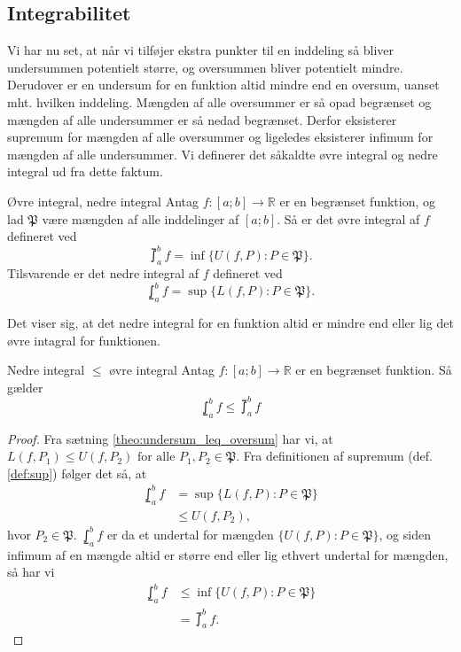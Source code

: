 \subsection{Integrabilitet}%
  \label{sub:Integrabilitet}

Vi har nu set, at når vi tilføjer ekstra punkter til en inddeling så bliver undersummen potentielt større, og oversummen bliver potentielt mindre.
Derudover er en undersum for en funktion altid mindre end en oversum, uanset mht. hvilken inddeling.
Mængden af alle oversummer er så opad begrænset og mængden af alle undersummer er så nedad begrænset. 
Derfor eksisterer supremum for mængden af alle oversummer og ligeledes eksisterer infimum for mængden af alle undersummer.
Vi definerer det såkaldte øvre integral og nedre integral ud fra dette faktum.

\begin{definition}[label=def:øvre_nedre_integral]{Øvre integral, nedre integral}{}
  Antag $f:[a;b] \to \mathbb{R}$ er en begrænset funktion, og lad $\mathfrak{P}$ være mængden af alle inddelinger af $[a;b]$.
  Så er det øvre integral af $f$ defineret ved
  \[
  \upint_{a}^{b} f = \inf \{ U(f, P):P \in \mathfrak{P} \}.
  \] 
  Tilsvarende er det nedre integral af $f$ defineret ved
  \[
  \lowint_{a}^{b} f = \sup \{ L(f, P):P \in \mathfrak{P} \}.
  \] 
\end{definition}

Det viser sig, at det nedre integral for en funktion altid er mindre end eller lig det øvre intagral for funktionen.

\begin{theorem}[label=theo:Nedre_int_leq_øvre_int]{Nedre integral $\leq$ øvre integral }{}
  Antag $f:[a;b] \to \mathbb{R}$ er en begrænset funktion. 
  Så gælder
  \[
  \lowint_{a}^{b} f \leq \upint_{a}^{b} f  
  \]
\end{theorem}
\begin{proof} 
  Fra sætning \ref{theo:undersum_leq_oversum} har vi, at $L(f,P_1) \leq U(f,P_2) \text{ for alle }P_1, P_2 \in \mathfrak{P}$.
  Fra definitionen af supremum (def. \ref{def:sup}) følger det så, at 
\begin{equation*}
\begin{split}
  \lowint_{a}^{b} f &= \sup \{ L(f, P) : P \in \mathfrak{P}\} \\
  &\leq U(f, P_2),
\end{split}
\end{equation*}
  hvor $P_2 \in \mathfrak{P}$.
  $\lowint_{a}^{b} f $ er da et undertal for mængden $\{ U(f, P): P \in \mathfrak{P}\} $, og siden infimum af en mængde altid er større end eller lig ethvert undertal for mængden, så har vi
  \begin{equation*}
  \begin{split}
    \lowint_{a}^{b} f &\leq \inf \{ U(f, P): P \in \mathfrak{P} \} \\
    &=\upint_{a}^{b} f.  
  \end{split}
  \end{equation*}
\end{proof}

